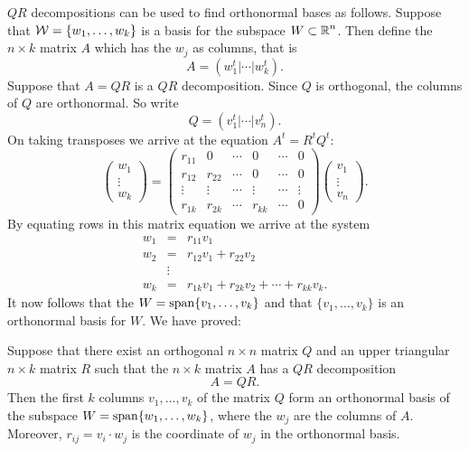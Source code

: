\documentclass{ximera}
\begin{document}
$QR$ decompositions can be used to find orthonormal bases as follows.
Suppose that ${\cal W} = \{w_1,\ldots,w_k\}$ is a basis for the subspace
$W\subset\mbox{$\Bbb{R}$}^n$.  Then define the $n\times k$ matrix $A$ which has the $w_j$
as columns, that is
\[
A = (w_1^t|\cdots|w_k^t).
\]
Suppose that $A=QR$ is a $QR$ decomposition.  Since $Q$ is orthogonal, the
columns of $Q$ are orthonormal.  So write
\[
Q = (v_1^t|\cdots|v_n^t).
\]
On taking transposes we arrive at the equation $A^t=R^tQ^t$:
\[
\left(\begin{array}{c} w_1 \\ \vdots \\ w_k \end{array} \right)
= \left(\begin{array}{cccccc}  r_{11} & 0 & \cdots & 0 & \cdots & 0\\
	r_{12} & r_{22} & \cdots & 0  & \cdots & 0 \\
	\vdots & \vdots & \cdots & \vdots & \cdots & \vdots\\
	r_{1k} & r_{2k} & \cdots & r_{kk}& \cdots & 0 \end{array} \right)
 \left(\begin{array}{c} v_1 \\ \vdots \\ v_n \end{array} \right).
\]
By equating rows in this matrix equation we arrive at the system
\begin{equation} \label{eq:wrv}
\begin{array}{rcl}
w_1 & = & r_{11}v_1 \\
w_2 & = & r_{12}v_1 + r_{22}v_2 \\
& \vdots & \\
w_k & = & r_{1k}v_1 + r_{2k}v_2 + \cdots + r_{kk}v_k.
\end{array}
\end{equation}
It now follows that the $W={\rm span}\{v_1,\ldots,v_k\}$ and that
$\{v_1,\ldots,v_k\}$ is an orthonormal basis for $W$.  We have proved:

\begin{proposition} \label{prop:qrdec}
Suppose that there exist an orthogonal $n\times n$ matrix $Q$ and an upper
triangular $n\times k$ matrix $R$ such that the $n\times k$ matrix $A$ has
a $QR$ decomposition
\[
A=QR.
\]
Then the first $k$ columns $v_1,\ldots,v_k$ of the matrix $Q$ form an
orthonormal basis
of the subspace $W={\rm span}\{w_1,\ldots,w_k\}$, where the $w_j$
are the columns of $A$.  Moreover, $r_{ij}=v_i\cdot w_j$ is the coordinate
of $w_j$ in the orthonormal basis.
\end{proposition}
\end{document}
